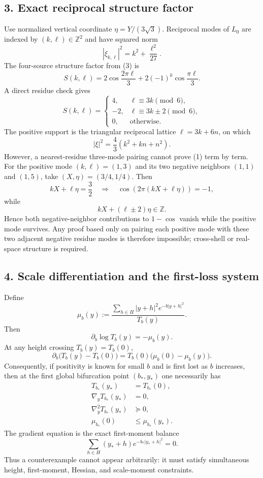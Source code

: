 \subsection*{3. Exact reciprocal structure factor}
Use normalized vertical coordinate $\eta=Y/(3\sqrt3)$.  Reciprocal modes of $L_0$ are indexed by $(k,\ell)\in\mathbb Z^2$ and have squared norm
\[
 |\xi_{k,\ell}|^2=k^2+\frac{\ell^2}{27}.
\]
The four-source structure factor from (3) is
\[
 S(k,\ell)=2\cos\frac{2\pi\ell}{3}+2(-1)^k\cos\frac{\pi\ell}{3}.
\]
A direct residue check gives
\[
 \boxed{
 S(k,\ell)=
 \begin{cases}
 4,&\ell\equiv 3k\pmod 6,\\
 -2,&\ell\equiv 3k\pm2\pmod 6,\\
 0,&\text{otherwise}.
 \end{cases}}\tag{5}
\]
The positive support is the triangular reciprocal lattice $\ell=3k+6n$, on which
\[
 |\xi|^2=\frac43(k^2+kn+n^2).
\]
However, a nearest-residue three-mode pairing cannot prove (1) term by term.  For the positive mode $(k,\ell)=(1,3)$ and its two negative neighbors $(1,1)$ and $(1,5)$, take $(X,\eta)=(3/4,1/4)$.  Then
\[
 kX+\ell\eta=\frac32\quad\Rightarrow\quad \cos(2\pi(kX+\ell\eta))=-1,
\]
while
\[
 kX+(\ell\pm2)\eta\in\mathbb Z.
\]
Hence both negative-neighbor contributions to $1-\cos$ vanish while the positive mode survives.  Any proof based only on pairing each positive mode with these two adjacent negative residue modes is therefore impossible; cross-shell or real-space structure is required.

\subsection*{4. Scale differentiation and the first-loss system}
Define
\[
 \mu_b(y):=
 \frac{\sum_{h\in H}|y+h|^2e^{-b|y+h|^2}}{T_b(y)}.
\]
Then
\[
 \boxed{\partial_b\log T_b(y)=-\mu_b(y).}\tag{6}
\]
At any height crossing $T_b(y)=T_b(0)$,
\[
 \boxed{\partial_b\big(T_b(y)-T_b(0)\big)
 =T_b(0)\big(\mu_b(0)-\mu_b(y)\big).}\tag{7}
\]
Consequently, if positivity is known for small $b$ and is first lost as $b$ increases, then at the first global bifurcation point $(b_*,y_*)$ one necessarily has
\[
 \begin{aligned}
 T_{b_*}(y_*)&=T_{b_*}(0),\\
 \nabla_yT_{b_*}(y_*)&=0,\\
 \nabla_y^2T_{b_*}(y_*)&\succeq0,\\
 \mu_{b_*}(0)&\le\mu_{b_*}(y_*).
 \end{aligned}\tag{8}
\]
The gradient equation is the exact first-moment balance
\[
 \boxed{\sum_{h\in H}(y_*+h)e^{-b_*|y_*+h|^2}=0.}\tag{9}
\]
Thus a counterexample cannot appear arbitrarily: it must satisfy simultaneous height, first-moment, Hessian, and scale-moment constraints.

